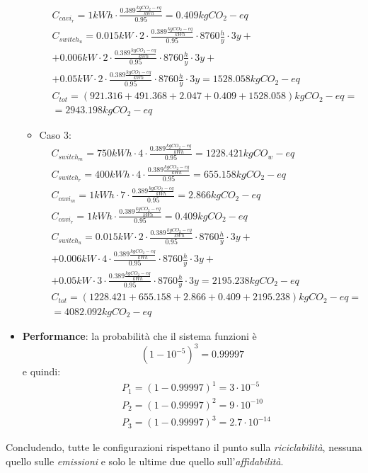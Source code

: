 \begin{itemize}
\begin{itemize}
\begin{equation*}
\begin{split}
				& C_{cavi_r} = 1kWh \cdot \frac{0.389 \frac{kg CO_2-eq}{kWh}}{0.95} = 0.409 kg CO_2-eq \\
				& C_{switch_u} = 0.015kW \cdot 2 \cdot \frac{0.389 \frac{kg CO_2-eq}{kWh}}{0.95} \cdot 8760\frac{h}{y}\cdot 3y +\\
				& + 0.006kW \cdot 2 \cdot \frac{0.389 \frac{kg CO_2-eq}{kWh}}{0.95} \cdot 8760\frac{h}{y} \cdot 3y+ \\
				& + 0.05kW \cdot 2 \cdot \frac{0.389 \frac{kg CO_2-eq}{kWh}}{0.95} \cdot 8760\frac{h}{y} \cdot 3y= 1528.058 kg CO_2-eq \\
				& C_{tot} = (921.316 + 491.368 + 2.047 + 0.409 + 1528.058)kg CO_2-eq = \\
				& = 2943.198 kg CO_2-eq
			\end{split}
		\end{equation*}
		\item Caso 3:
		\begin{equation*}
			\begin{split}
				& C_{switch_m} = 750kWh \cdot 4 \cdot \frac{0.389 \frac{kg CO_2-eq}{kWh}}{0.95} = 1228.421 kg CO_w-eq\\
				& C_{switch_r} = 400 kWh \cdot 4 \cdot \frac{0.389 \frac{kg CO_2-eq}{kWh}}{0.95} = 655.158 kg CO_2-eq \\
				& C_{cavi_m} = 1kWh \cdot 7 \cdot \frac{0.389 \frac{kg CO_2-eq}{kWh}}{0.95}  = 2.866 kg CO_2-eq\\
				& C_{cavi_r} = 1kWh \cdot \frac{0.389 \frac{kg CO_2-eq}{kWh}}{0.95} = 0.409 kg CO_2-eq \\
				& C_{switch_u} = 0.015kW \cdot 2 \cdot \frac{0.389 \frac{kg CO_2-eq}{kWh}}{0.95} \cdot 8760\frac{h}{y} \cdot 3y+\\
				&+ 0.006kW \cdot 4 \cdot \frac{0.389 \frac{kg CO_2-eq}{kWh}}{0.95} \cdot 8760\frac{h}{y} \cdot 3y+ \\
				& + 0.05kW \cdot 3 \cdot \frac{0.389 \frac{kg CO_2-eq}{kWh}}{0.95} \cdot 8760\frac{h}{y} \cdot 3y= 2195.238 kg CO_2-eq \\
				& C_{tot} = (1228.421 + 655.158 + 2.866 + 0.409 + 2195.238)kg CO_2-eq =\\
				& = 4082.092 kg CO_2-eq
			\end{split}
		\end{equation*}
	\end{itemize}
	\item \textbf{Performance}: la probabilità che il sistema funzioni è
	\begin{equation*}
		(1-10^{-5})^3 = 0.99997
	\end{equation*}
	e quindi:
	\begin{equation*}
		\begin{split}
			& P_1 = (1-0.99997)^1 = 3 \cdot 10^{-5}\\
			& P_2 = (1-0.99997)^2 = 9 \cdot 10^{-10} \\
			& P_3 =(1-0.99997)^3 = 2.7 \cdot 10^{-14}
		\end{split}
	\end{equation*}
\end{itemize}
Concludendo, tutte le configurazioni rispettano il punto sulla \emph{riciclabilità}, nessuna quello sulle \emph{emissioni} e solo le ultime due quello sull'\emph{affidabilità}.